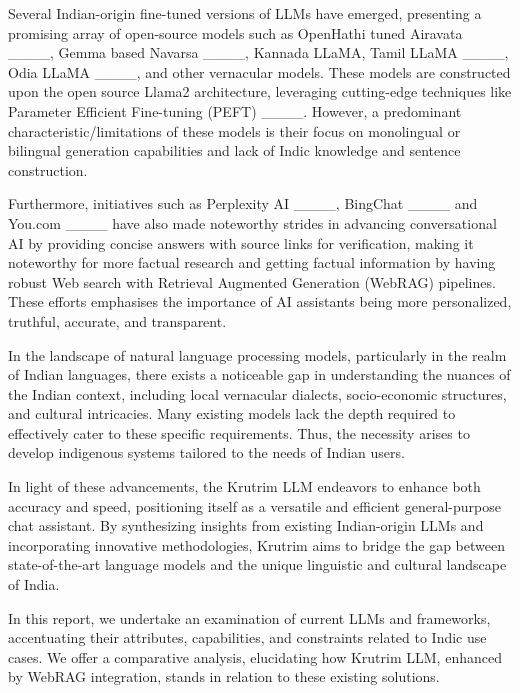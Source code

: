 Several Indian-origin fine-tuned versions of LLMs have emerged, presenting a promising array of open-source models such as OpenHathi tuned Airavata ____, Gemma based Navarsa ____, Kannada LLaMA, Tamil LLaMA ____, Odia LLaMA ____, and other vernacular models. These models are constructed upon the open source Llama2 architecture, leveraging cutting-edge techniques like Parameter Efficient Fine-tuning (PEFT) ____. However, a predominant characteristic/limitations of these models is their focus on monolingual or bilingual generation capabilities and lack of Indic knowledge and sentence construction.

Furthermore, initiatives such as Perplexity AI ____, BingChat ____ and You.com ____ have also made noteworthy strides in advancing conversational AI by providing concise answers with source links for verification, making it noteworthy for more factual research and getting factual information by having robust Web search with Retrieval Augmented Generation (WebRAG) pipelines. These efforts emphasises the importance of AI assistants being more personalized, truthful, accurate, and transparent.

In the landscape of natural language processing models, particularly in the realm of Indian languages, there exists a noticeable gap in understanding the nuances of the Indian context, including local vernacular dialects, socio-economic structures, and cultural intricacies. Many existing models lack the depth required to effectively cater to these specific requirements. Thus, the necessity arises to develop indigenous systems tailored to the needs of Indian users.

In light of these advancements, the Krutrim LLM endeavors to enhance both accuracy and speed, positioning itself as a versatile and efficient general-purpose chat assistant. By synthesizing insights from existing Indian-origin LLMs and incorporating innovative methodologies, Krutrim aims to bridge the gap between state-of-the-art language models and the unique linguistic and cultural landscape of India.

In this report, we undertake an examination of current LLMs and frameworks, accentuating their attributes, capabilities, and constraints related to Indic use cases. We offer a comparative analysis, elucidating how Krutrim LLM, enhanced by WebRAG integration, stands in relation to these existing solutions.


